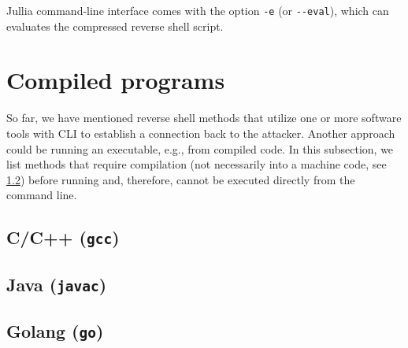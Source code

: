 
Jullia command-line interface comes with the option \texttt{-e} (or \texttt{-{}-eval}), which can evaluates the compressed reverse shell script.


\section{Compiled programs}

So far, we have mentioned reverse shell methods that utilize one or more software tools with CLI to establish a connection back to the attacker. Another approach could be running an executable, e.g., from compiled code. In this subsection, we list methods that require compilation (not necessarily into a machine code, see \cref{java}) before running and, therefore, cannot be executed directly from the command line.

\subsection{C/C++ (\texttt{gcc})}



\dpd{}

\subsection{Java (\texttt{javac})}
\label{java}





\subsection{Golang (\texttt{go})}



